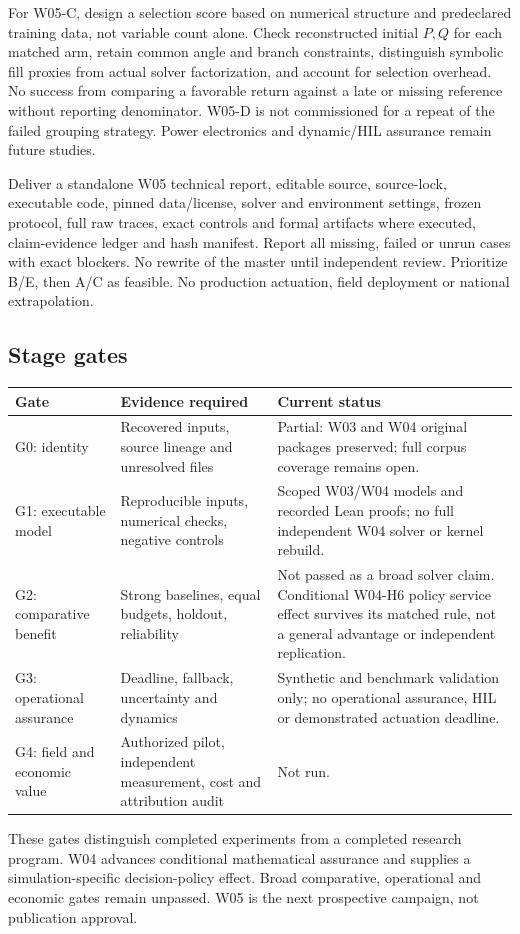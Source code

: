 \documentclass[11pt,letterpaper]{article}
\begin{document}
For W05-C, design a selection score based on numerical structure and predeclared training data, not variable count alone. Check reconstructed initial $P,Q$ for each matched arm, retain common angle and branch constraints, distinguish symbolic fill proxies from actual solver factorization, and account for selection overhead. No success from comparing a favorable return against a late or missing reference without reporting denominator. W05-D is not commissioned for a repeat of the failed grouping strategy. Power electronics and dynamic/HIL assurance remain future studies.

Deliver a standalone W05 technical report, editable source, source-lock, executable code, pinned data/license, solver and environment settings, frozen protocol, full raw traces, exact controls and formal artifacts where executed, claim-evidence ledger and hash manifest. Report all missing, failed or unrun cases with exact blockers. No rewrite of the master until independent review. Prioritize B/E, then A/C as feasible. No production actuation, field deployment or national extrapolation.

\subsection{Stage gates}
\begin{longtable}{P{.17\linewidth}P{.44\linewidth}P{.30\linewidth}}
\toprule Gate & Evidence required & Current status\\\midrule\endhead
G0: identity & Recovered inputs, source lineage and unresolved files & Partial: W03 and W04 original packages preserved; full corpus coverage remains open.\\
G1: executable model & Reproducible inputs, numerical checks, negative controls & Scoped W03/W04 models and recorded Lean proofs; no full independent W04 solver or kernel rebuild.\\
G2: comparative benefit & Strong baselines, equal budgets, holdout, reliability & Not passed as a broad solver claim. Conditional W04-H6 policy service effect survives its matched rule, not a general advantage or independent replication.\\
G3: operational assurance & Deadline, fallback, uncertainty and dynamics & Synthetic and benchmark validation only; no operational assurance, HIL or demonstrated actuation deadline.\\
G4: field and economic value & Authorized pilot, independent measurement, cost and attribution audit & Not run.\\
\bottomrule
\end{longtable}
These gates distinguish completed experiments from a completed research program. W04 advances conditional mathematical assurance and supplies a simulation-specific decision-policy effect. Broad comparative, operational and economic gates remain unpassed. W05 is the next prospective campaign, not publication approval.
\end{document}
